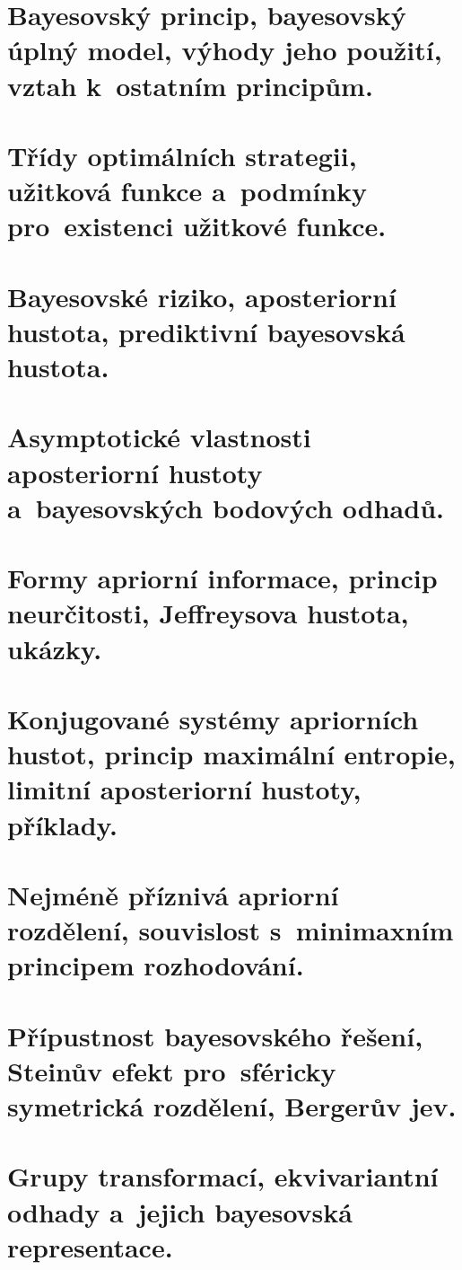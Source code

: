 \chapter{Bayesovský princip, bayesovský úplný model, výhody jeho použití, vztah k~ostatním principům.}


\chapter{Třídy optimálních strategii, užitková funkce a~podmínky pro~existenci užitkové funkce.}


\chapter{Bayesovské riziko, aposteriorní hustota, prediktivní bayesovská hustota.}


\chapter{Asymptotické vlastnosti aposteriorní hustoty a~bayesovských bodových odhadů.}


\chapter{Formy apriorní informace, princip neurčitosti, Jeffreysova hustota, ukázky.}


\chapter{Konjugované systémy apriorních hustot, princip maximální entropie, limitní aposteriorní hustoty, příklady.}


\chapter{Nejméně příznivá apriorní rozdělení, souvislost s~minimaxním principem rozhodování.}


\chapter{Přípustnost bayesovského řešení, Steinův efekt pro~sféricky symetrická rozdělení, Bergerův jev.}


\chapter{Grupy transformací, ekvivariantní odhady a~jejich bayesovská representace.}


